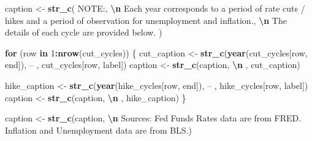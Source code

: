 \documentclass[
]{article}
\newenvironment{Shaded}{\begin{snugshade}}{\end{snugshade}}
\newcommand{\ControlFlowTok}[1]{\textcolor[rgb]{0.13,0.29,0.53}{\textbf{#1}}}
\newcommand{\DecValTok}[1]{\textcolor[rgb]{0.00,0.00,0.81}{#1}}
\newcommand{\FunctionTok}[1]{\textcolor[rgb]{0.13,0.29,0.53}{\textbf{#1}}}
\newcommand{\NormalTok}[1]{#1}
\newcommand{\OtherTok}[1]{\textcolor[rgb]{0.56,0.35,0.01}{#1}}
\newcommand{\SpecialCharTok}[1]{\textcolor[rgb]{0.81,0.36,0.00}{\textbf{#1}}}
\newcommand{\StringTok}[1]{\textcolor[rgb]{0.31,0.60,0.02}{#1}}
\begin{document}
\begin{Shaded}
\begin{Highlighting}[]
\NormalTok{caption }\OtherTok{\textless{}{-}} \FunctionTok{str\_c}\NormalTok{(}
  \StringTok{\textquotesingle{}NOTE:\textquotesingle{}}\NormalTok{,}
  \StringTok{\textquotesingle{}}\SpecialCharTok{\textbackslash{}n}\StringTok{ Each year corresponds to a period of rate cuts / hikes and a period of observation for unemployment and inflation.\textquotesingle{}}\NormalTok{,}
  \StringTok{\textquotesingle{}}\SpecialCharTok{\textbackslash{}n}\StringTok{ The details of each cycle are provided below.\textquotesingle{}}
\NormalTok{)}
  
\ControlFlowTok{for}\NormalTok{ (row }\ControlFlowTok{in} \DecValTok{1}\SpecialCharTok{:}\FunctionTok{nrow}\NormalTok{(cut\_cycles)) \{}
\NormalTok{  cut\_caption }\OtherTok{\textless{}{-}} \FunctionTok{str\_c}\NormalTok{(}\FunctionTok{year}\NormalTok{(cut\_cycles[row, }\StringTok{\textquotesingle{}end\textquotesingle{}}\NormalTok{]), }\StringTok{\textquotesingle{} – \textquotesingle{}}\NormalTok{, cut\_cycles[row, }\StringTok{\textquotesingle{}label\textquotesingle{}}\NormalTok{])}
\NormalTok{  caption }\OtherTok{\textless{}{-}} \FunctionTok{str\_c}\NormalTok{(caption, }\StringTok{\textquotesingle{}}\SpecialCharTok{\textbackslash{}n}\StringTok{     \textquotesingle{}}\NormalTok{, cut\_caption)}
  
\NormalTok{  hike\_caption }\OtherTok{\textless{}{-}} \FunctionTok{str\_c}\NormalTok{(}\FunctionTok{year}\NormalTok{(hike\_cycles[row, }\StringTok{\textquotesingle{}end\textquotesingle{}}\NormalTok{]), }\StringTok{\textquotesingle{} – \textquotesingle{}}\NormalTok{, hike\_cycles[row, }\StringTok{\textquotesingle{}label\textquotesingle{}}\NormalTok{])}
\NormalTok{  caption }\OtherTok{\textless{}{-}} \FunctionTok{str\_c}\NormalTok{(caption, }\StringTok{\textquotesingle{}}\SpecialCharTok{\textbackslash{}n}\StringTok{     \textquotesingle{}}\NormalTok{, hike\_caption)}
\NormalTok{\}}

\NormalTok{caption }\OtherTok{\textless{}{-}} \FunctionTok{str\_c}\NormalTok{(caption, }\StringTok{\textquotesingle{}}\SpecialCharTok{\textbackslash{}n}\StringTok{ Sources: Fed Funds Rates data are from FRED. Inflation and Unemployment data are from BLS.\textquotesingle{}}\NormalTok{)}


\end{Highlighting}
\end{Shaded}
\end{document}
